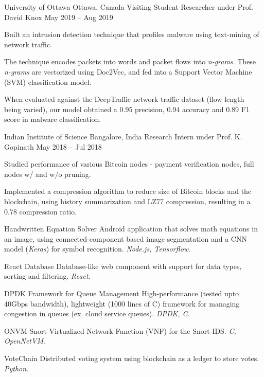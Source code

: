 \documentclass[11pt,a4paper]{article}
\begin{document}
\headedsection
{University of Ottawa}
{Ottawa, Canada}
{Visiting Student Researcher under Prof. David Knox}
{May 2019 -- Aug 2019}{
	\begin{circlist}
		\item Built an intrusion detection technique that profiles malware using text-mining of network traffic.
		\item The technique encodes packets into words and packet flows into \textit{n-grams}. These \textit{n-grams} are vectorized using Doc2Vec, and fed into a Support Vector Machine (SVM) classification model.
		\item When evaluated against the DeepTraffic network traffic dataset (flow length being varied), our model obtained a 0.95 precision, 0.94 accuracy and 0.89 F1 score in malware classification.
	\end{circlist}
}

\headedsection
{Indian Institute of Science}
{Bangalore, India}
{Research Intern under Prof. K. Gopinath}
{May 2018 -- Jul 2018}{
	\begin{circlist}
		\item Studied performance of various Bitcoin nodes - payment verification nodes, full nodes w/ and w/o pruning.
		\item Implemented a compression algorithm to reduce size of Bitcoin blocks and the blockchain, using history summarization and LZ77 compression, resulting in a 0.78 compression ratio.
	\end{circlist}
}


\headedsectiontwo
{Handwritten Equation Solver}{}{}
{
	Android application that solves math equations in an image, using connected-component based image segmentation and a CNN model (\textit{Keras}) for symbol recognition. \textit{Node.js, Tensorflow}.
}

\headedsectiontwo
{React Database}{}{}
{
	Database-like web component with support for data types, sorting and filtering. \textit{React}.
}

\headedsectiontwo
{DPDK Framework for Queue Management}{}{}
{
	High-performance (tested upto 40Gbps bandwidth), lightweight (1000 lines of C) framework for managing congestion in queues (ex. cloud service queues). \textit{DPDK, C}.
}

\headedsectiontwo
{ONVM-Snort}{}{}
{
	Virtualized Network Function (VNF) for the Snort IDS. \textit{C, OpenNetVM}.
}

\headedsectiontwo
{VoteChain}{}{}
{
	Distributed voting system using blockchain as a ledger to store votes. \textit{Python}.
}
\end{document}
